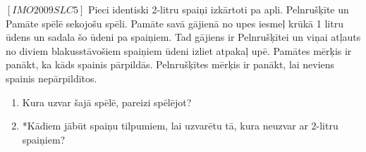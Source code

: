 \begin{problem}
$[IMO2009SLC5]$
Pieci identiski 2-litru spaiņi izkārtoti pa apli. Pelnrušķīte un Pamāte spēlē sekojošu spēli. Pamāte savā gājienā no upes iesmeļ krūkā 1 litru ūdens un sadala šo ūdeni pa spaiņiem. Tad gājiens ir Pelnrušķītei un viņai atļauts no diviem blakusstāvošiem spaiņiem ūdeni izliet atpakaļ upē. Pamātes mērķis ir panākt, ka kāds spainis pārpildās. Pelnrušķītes mērķis ir panākt, lai neviens spainis nepārpildītos.
\begin{enumerate}
\item Kura uzvar šajā spēlē, pareizi spēlējot?
\item *Kādiem jābūt spaiņu tilpumiem, lai uzvarētu tā, kura neuzvar ar 2-litru spaiņiem?
\end{enumerate}
\end{problem}

